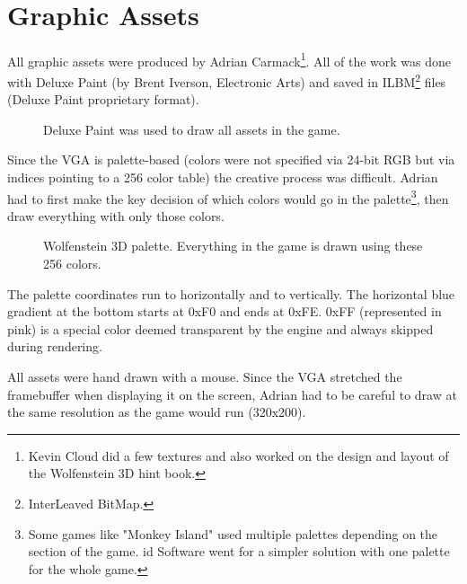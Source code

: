 \documentclass[book.tex]{subfiles}
\begin{document}
  \\
\vspace{-5pt}  
\par
\vspace{5pt}
\section{Graphic Assets}

All graphic assets were produced by Adrian Carmack\footnote{Kevin Cloud did a few textures and also worked on the design and layout of the Wolfenstein 3D hint book.}. All of the work was done with Deluxe Paint (by Brent Iverson, Electronic Arts) and saved in ILBM\footnote{InterLeaved BitMap.} files (Deluxe Paint proprietary format). 

\begin{figure}[H]
  \centering
 \caption{Deluxe Paint was used to draw all assets in the game.}
\end{figure}


\par
Since the VGA is palette-based (colors were not specified via 24-bit RGB but via indices pointing to a 256 color table) the creative process was difficult. Adrian had to first make the key decision of which colors would go in the palette\footnote{Some games like "Monkey Island" used multiple palettes depending on the section of the game. id Software went for a simpler solution with one palette for the whole game.}, then draw everything with only those colors.\\
\begin{figure}[H]
  \centering
{}
 \caption{Wolfenstein 3D palette. Everything in the game is drawn using these 256 colors.}
\end{figure}
The palette coordinates run  to  horizontally and  to  vertically. The horizontal blue gradient at the bottom starts at 0xF0 and ends at 0xFE. 0xFF (represented in pink) is a special color deemed transparent by the engine and always skipped during rendering.\\
\par

All assets were hand drawn with a mouse. Since the VGA stretched the framebuffer when displaying it on the screen, Adrian had to be careful to draw at the same resolution as the game would run (320x200).
\end{document}
